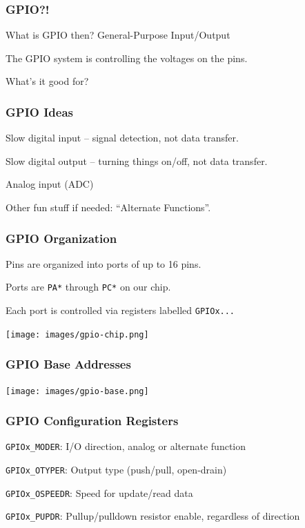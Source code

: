 \begin{frame}
\frametitle{GPIO?!}

What is GPIO then? General-Purpose Input/Output

The GPIO system is controlling the voltages on the pins.
 
What's it good for?

\end{frame}


\begin{frame}
\frametitle{GPIO Ideas}

Slow digital input -- signal detection, not data transfer.

Slow digital output -- turning things on/off, not data transfer.

Analog input (ADC)

Other fun stuff if needed: ``Alternate Functions''.

\end{frame}


\begin{frame}
\frametitle{GPIO Organization}

Pins are organized into \alert{ports} of up to 16 pins.

Ports are \texttt{PA*} through \texttt{PC*} on our chip.

Each port is controlled via registers labelled \texttt{GPIOx...}

\begin{center}
	\texttt{[image: images/gpio-chip.png]}
\end{center}

\end{frame}


\begin{frame}
\frametitle{GPIO Base Addresses}

\begin{center}
	\texttt{[image: images/gpio-base.png]}
\end{center}


\end{frame}


\begin{frame}
\frametitle{GPIO Configuration Registers}

\texttt{GPIOx\_MODER}: I/O direction, analog or alternate function

\texttt{GPIOx\_OTYPER}: Output type (push/pull, open-drain)

\texttt{GPIOx\_OSPEEDR}: Speed for update/read data

\texttt{GPIOx\_PUPDR}: Pullup/pulldown resistor enable, regardless of direction

\end{frame}


